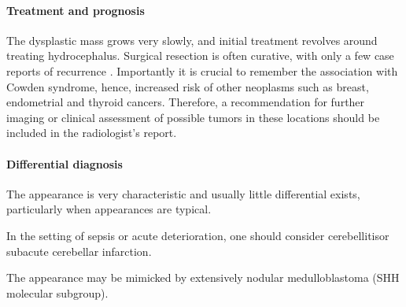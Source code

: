 \paragraph{Treatment and prognosis}

The dysplastic mass grows very slowly, and initial treatment revolves around treating hydrocephalus. Surgical resection is often curative, with only a few case reports of recurrence . Importantly it is crucial to remember the association with Cowden syndrome, hence, increased risk of other neoplasms such as breast, endometrial and thyroid cancers. Therefore, a recommendation for further imaging or clinical assessment of possible tumors in these locations should be included in the radiologist's report.

\paragraph{Differential diagnosis}

The appearance is very characteristic and usually little differential exists, particularly when appearances are typical.

In the setting of sepsis or acute deterioration, one should consider cerebellitisor subacute cerebellar infarction.

The appearance may be mimicked by extensively nodular medulloblastoma (SHH molecular subgroup).